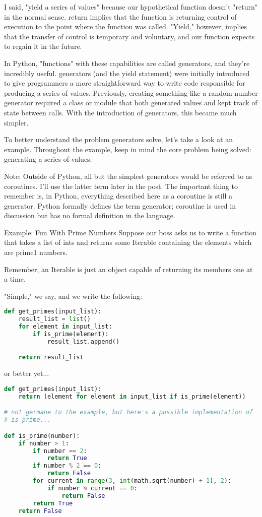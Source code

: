 I said, "yield a series of values" because our hypothetical function doesn't "return" in the normal sense. return implies that the function is returning control of execution to the point where the function was called. "Yield," however, implies that the transfer of control is temporary and voluntary, and our function expects to regain it in the future.

In Python, "functions" with these capabilities are called generators, and they're incredibly useful. generators (and the yield statement) were initially introduced to give programmers a more straightforward way to write code responsible for producing a series of values. Previously, creating something like a random number generator required a class or module that both generated values and kept track of state between calls. With the introduction of generators, this became much simpler.

To better understand the problem generators solve, let's take a look at an example. Throughout the example, keep in mind the core problem being solved: generating a series of values.

Note: Outside of Python, all but the simplest generators would be referred to as coroutines. I'll use the latter term later in the post. The important thing to remember is, in Python, everything described here as a coroutine is still a generator. Python formally defines the term generator; coroutine is used in discussion but has no formal definition in the language.

Example: Fun With Prime Numbers
Suppose our boss asks us to write a function that takes a list of ints and returns some Iterable containing the elements which are prime1 numbers.

Remember, an Iterable is just an object capable of returning its members one at a time.

"Simple," we say, and we write the following:

\begin{lstlisting}[language=Python]
def get_primes(input_list):
    result_list = list()
    for element in input_list:
        if is_prime(element):
            result_list.append()

    return result_list
\end{lstlisting}

or better yet...

\begin{lstlisting}[language=Python]
def get_primes(input_list):
    return (element for element in input_list if is_prime(element))

# not germane to the example, but here's a possible implementation of
# is_prime...

def is_prime(number):
    if number > 1:
        if number == 2:
            return True
        if number % 2 == 0:
            return False
        for current in range(3, int(math.sqrt(number) + 1), 2):
            if number % current == 0:
                return False
        return True
    return False
\end{lstlisting}


